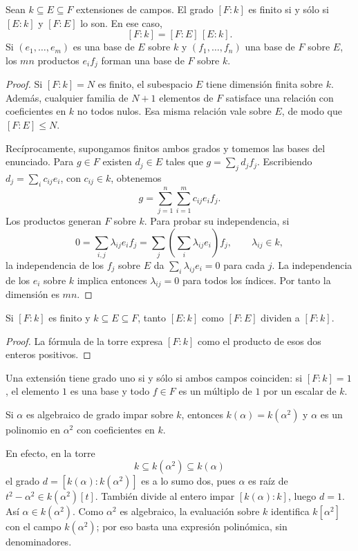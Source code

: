 \begin{prop}\label{prop:C23-torre}
Sean $k\subseteq E\subseteq F$ extensiones de campos. El grado $[F:k]$ es finito si y sólo si $[E:k]$ y $[F:E]$ lo son. En ese caso,
\[
[F:k]=[F:E]\,[E:k].
\]
Si $(e_1,\ldots,e_m)$ es una base de $E$ sobre $k$ y $(f_1,\ldots,f_n)$ una base de $F$ sobre $E$, los $mn$ productos $e_if_j$ forman una base de $F$ sobre $k$.
\end{prop}
\begin{proof}
Si $[F:k]=N$ es finito, el subespacio $E$ tiene dimensión finita sobre $k$. Además, cualquier familia de $N+1$ elementos de $F$ satisface una relación con coeficientes en $k$ no todos nulos. Esa misma relación vale sobre $E$, de modo que $[F:E]\leq N$.

Recíprocamente, supongamos finitos ambos grados y tomemos las bases del enunciado. Para $g\in F$ existen $d_j\in E$ tales que $g=\sum_jd_jf_j$. Escribiendo $d_j=\sum_ic_{ij}e_i$, con $c_{ij}\in k$, obtenemos
\[
g=\sum_{j=1}^n\sum_{i=1}^m c_{ij}e_if_j.
\]
Los productos generan $F$ sobre $k$. Para probar su independencia, si
\[
0=\sum_{i,j}\lambda_{ij}e_if_j
=\sum_j\left(\sum_i\lambda_{ij}e_i\right)f_j,
\qquad \lambda_{ij}\in k,
\]
la independencia de los $f_j$ sobre $E$ da $\sum_i\lambda_{ij}e_i=0$ para cada $j$. La independencia de los $e_i$ sobre $k$ implica entonces $\lambda_{ij}=0$ para todos los índices. Por tanto la dimensión es $mn$.
\end{proof}

\begin{coro}\label{coro:C23-divisibilidad}
Si $[F:k]$ es finito y $k\subseteq E\subseteq F$, tanto $[E:k]$ como $[F:E]$ dividen a $[F:k]$.
\end{coro}
\begin{proof}
La fórmula de la torre expresa $[F:k]$ como el producto de esos dos enteros positivos.
\end{proof}
Una extensión tiene grado uno si y sólo si ambos campos coinciden: si $[F:k]=1$, el elemento $1$ es una base y todo $f\in F$ es un múltiplo de $1$ por un escalar de $k$.

\begin{ejem}
Si $\alpha$ es algebraico de grado impar sobre $k$, entonces $k(\alpha)=k(\alpha^2)$ y $\alpha$ es un polinomio en $\alpha^2$ con coeficientes en $k$.

En efecto, en la torre
\[
k\subseteq k(\alpha^2)\subseteq k(\alpha)
\]
el grado $d=[k(\alpha):k(\alpha^2)]$ es a lo sumo dos, pues $\alpha$ es raíz de $t^2-\alpha^2\in k(\alpha^2)[t]$. También divide al entero impar $[k(\alpha):k]$, luego $d=1$. Así $\alpha\in k(\alpha^2)$. Como $\alpha^2$ es algebraico, la evaluación sobre $k$ identifica $k[\alpha^2]$ con el campo $k(\alpha^2)$; por eso basta una expresión polinómica, sin denominadores.
\end{ejem}

